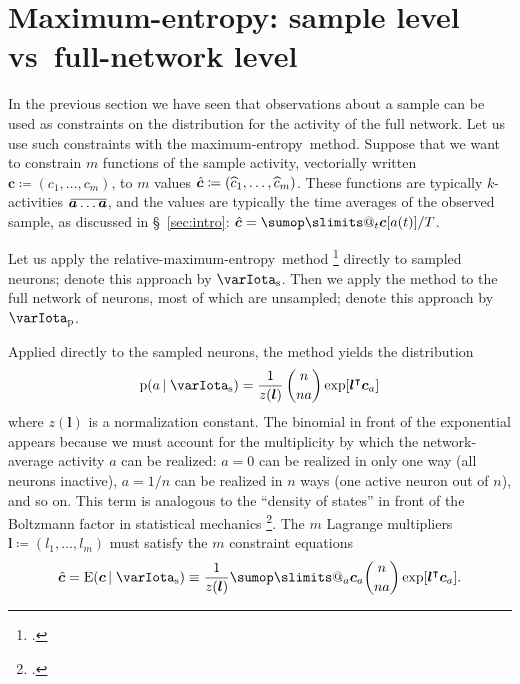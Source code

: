 \documentclass[\ifafour a4paper,12pt,\else a5paper,10pt,\fi%
onecolumn,oneside,article,%
british%
]{memoir}
\makeatletter
\theoremstyle{remark}
\theoremstyle{innote}
\def\sum{\DOTSI\sumop\slimits@}
\newcommand*{\citep}{\footcites}
\newcommand*{\defd}{\coloneqq}
\newcommand*{\pf}{\mathrm{p}}%
\newcommand*{\E}{\mathrm{E}}
\renewcommand*{\|}[1][]{\nonscript\,#1\vert\nonscript\;\mathopen{}}
\newcommand*{\sect}{\S}%
\newcommand*{\chap}{ch.}%
\newcommand*{\vs}{{vs}}
\newcommand*{\T}{^\intercal}%
\newcommand*{\widebar}[1]{{\mkern1.5mu\skew{2}\overline{\mkern-1.5mu#1\mkern-1.5mu}\mkern 1.5mu}}
\newcommand*{\sav}{\widebar} %
\newcommand*{\yav}{a}
\newcommand*{\yaa}{\bm{\yav}}%
\newcommand*{\ya}{\yav}%
\newcommand*{\yHa}{\varIota_\textrm{p}}
\newcommand*{\yHb}{\varIota_\textrm{s}}
\newcommand*{\yg}{\bm{c}}
\newcommand*{\yc}{\Hat{\bm{c}}}
\newcommand*{\yl}{\bm{l}}
\newcommand*{\yk}{z}
\newcommand*{\me}{maximum-entropy}
\makeatother
\begin{document}
\section{Maximum-entropy: sample level \vs\ full-network level}
\label{sec:specific_initial_probability}

In the previous section we have seen that observations about a sample can
be used as constraints on the distribution for the activity of the full
network. Let us use such constraints with the \me\ method. Suppose that
we want to constrain $m$ functions of the sample activity, vectorially
written $\yg \defd (c_1,\dotsc,c_m)$, to $m$ values
$\yc \defd (\widehat{c}_1,\dotsc,\widehat{c}_m)$. These functions are typically $k$-activities
$\sav{\yaa\dotso \yaa}$, and the values are typically the time averages of
the observed sample, as discussed in \sect~\ref{sec:intro}:
$\yc = \sum_t \yg[\ya(t)]/T$.

Let us apply the relative-\me\ method \citep{sivia1996_r2006,meadetal1984}
directly to sampled neurons; denote this approach by $\yHb$. Then we apply
the method to the full network of neurons, most of which are unsampled;
denote this approach by $\yHa$.

Applied directly to the sampled neurons, the method yields the distribution
\begin{equation}
  \label{eq:app_maxent_sample}
  \pf(\ya \|\yHb)
  =\frac{1}{\yk(\yl)}\,
  \binom{n}{n\ya}
  \exp[\yl\T \yg_{\ya}]
\end{equation}
where $\yk(\yl)$ is a normalization constant. The binomial in front of the
exponential appears because we must account for the multiplicity by which
the network-average activity $\ya$ can be realized: $\ya=0$ can be
realized in only one way (all neurons inactive), $\ya=1/n$ can be realized
in $n$ ways (one active neuron out of $n$), and so on. This term is analogous to
the \enquote{density of states} in front of the Boltzmann factor in
statistical mechanics \citep[\chap~16]{callen1960_r1985}. The $m$ Lagrange
multipliers $\yl\defd (l_1,\dotsc,l_m)$ must satisfy the $m$ constraint
equations
\begin{equation}
  \label{eq:app_maxent_sample_constraints}
  \yc = \E(\yg \|\yHb) \equiv
  \frac{1}{\yk(\yl)}\sum_{\ya}  \yg_{\ya} \binom{n}{n\ya}
  \exp[\yl\T \yg_{\ya}].%
\end{equation}
\end{document}
